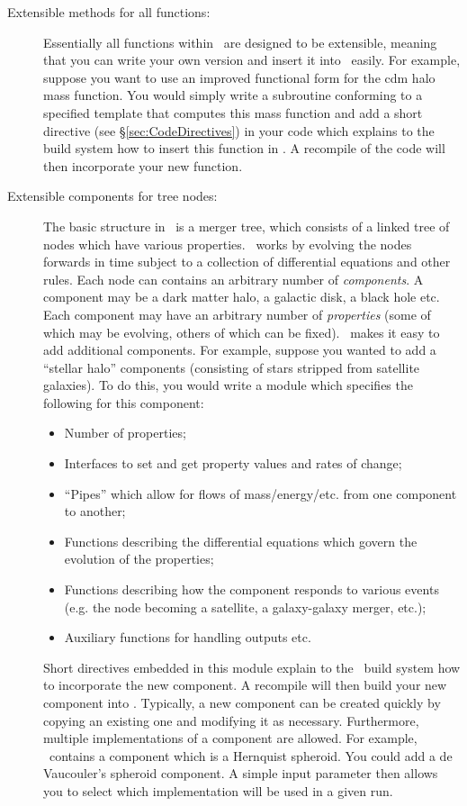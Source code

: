 \begin{description}
 \item [Extensible methods for all functions:] Essentially all functions within \glc\ are designed to be extensible, meaning that you can write your own version and insert it into \glc\ easily. For example, suppose you want to use an improved functional form for the \gls{cdm} halo mass function. You would simply write a subroutine conforming to a specified template that computes this mass function and add a short directive (see \S\ref{sec:CodeDirectives}) in your code which explains to the build system how to insert this function in \glc. A recompile of the code will then incorporate your new function.

 \item [Extensible components for tree nodes:] The basic structure in \glc\ is a merger tree, which consists of a linked tree of nodes which have various properties. \glc\ works by evolving the nodes forwards in time subject to a collection of differential equations and other rules. Each node can contains an arbitrary number of \emph{components}. A component may be a dark matter halo, a galactic disk, a black hole etc. Each component may have an arbitrary number of \emph{properties} (some of which may be evolving, others of which can be fixed). \glc\ makes it easy to add additional components. For example, suppose you wanted to add a ``stellar halo'' components (consisting of stars stripped from satellite galaxies). To do this, you would write a module which specifies the following for this component:
 \begin{itemize}
  \item Number of properties;
  \item Interfaces to set and get property values and rates of change;
  \item ``Pipes'' which allow for flows of mass/energy/etc. from one component to another;
  \item Functions describing the differential equations which govern the evolution of the properties;
  \item Functions describing how the component responds to various events (e.g. the node becoming a satellite, a galaxy-galaxy merger, etc.);
  \item Auxiliary functions for handling outputs etc.
 \end{itemize}
 Short directives embedded in this module explain to the \glc\ build system how to incorporate the new component. A recompile will then build your new component into \glc. Typically, a new component can be created quickly by copying an existing one and modifying it as necessary. Furthermore, multiple implementations of a component are allowed. For example, \glc\ contains a component which is a Hernquist spheroid. You could add a de Vaucouler's spheroid component. A simple input parameter then allows you to select which implementation will be used in a given run.


\end{description}
